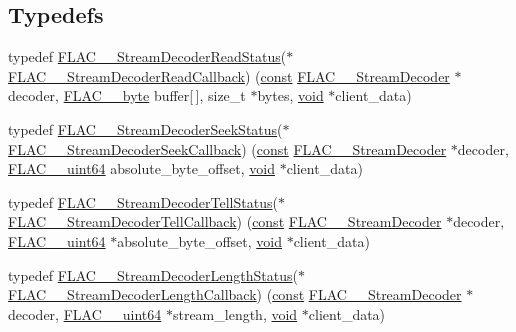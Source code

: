 \subsection*{Typedefs}
\begin{DoxyCompactItemize}
\item 
typedef \hyperlink{group__flac__stream__decoder_gad793ead451206c64a91dc0b851027b93}{F\+L\+A\+C\+\_\+\+\_\+\+Stream\+Decoder\+Read\+Status}($\ast$ \hyperlink{group__flac__stream__decoder_ga25d4321dc2f122d35ddc9061f44beae7}{F\+L\+A\+C\+\_\+\+\_\+\+Stream\+Decoder\+Read\+Callback}) (\hyperlink{zconf_8h_a2c212835823e3c54a8ab6d95c652660e}{const} \hyperlink{struct_f_l_a_c_____stream_decoder}{F\+L\+A\+C\+\_\+\+\_\+\+Stream\+Decoder} $\ast$decoder, \hyperlink{ordinals_8h_a5eb569b12d5b047cdacada4d57924ee3}{F\+L\+A\+C\+\_\+\+\_\+byte} buffer\mbox{[}$\,$\mbox{]}, size\+\_\+t $\ast$bytes, \hyperlink{png_8h_ac9c84fa68bbad002983e35ce3663c686}{void} $\ast$client\+\_\+data)
\item 
typedef \hyperlink{group__flac__stream__decoder_gac8d269e3c7af1a5889d3bd38409ed67d}{F\+L\+A\+C\+\_\+\+\_\+\+Stream\+Decoder\+Seek\+Status}($\ast$ \hyperlink{group__flac__stream__decoder_ga4c18b0216e0f7a83d7e4e7001230545d}{F\+L\+A\+C\+\_\+\+\_\+\+Stream\+Decoder\+Seek\+Callback}) (\hyperlink{zconf_8h_a2c212835823e3c54a8ab6d95c652660e}{const} \hyperlink{struct_f_l_a_c_____stream_decoder}{F\+L\+A\+C\+\_\+\+\_\+\+Stream\+Decoder} $\ast$decoder, \hyperlink{ordinals_8h_aa78c8c70a3eb8a58af7436f278acde8e}{F\+L\+A\+C\+\_\+\+\_\+uint64} absolute\+\_\+byte\+\_\+offset, \hyperlink{png_8h_ac9c84fa68bbad002983e35ce3663c686}{void} $\ast$client\+\_\+data)
\item 
typedef \hyperlink{group__flac__stream__decoder_ga83708207969383bd7b5c1e9148528845}{F\+L\+A\+C\+\_\+\+\_\+\+Stream\+Decoder\+Tell\+Status}($\ast$ \hyperlink{group__flac__stream__decoder_gafdf1852486617a40c285c0d76d451a5a}{F\+L\+A\+C\+\_\+\+\_\+\+Stream\+Decoder\+Tell\+Callback}) (\hyperlink{zconf_8h_a2c212835823e3c54a8ab6d95c652660e}{const} \hyperlink{struct_f_l_a_c_____stream_decoder}{F\+L\+A\+C\+\_\+\+\_\+\+Stream\+Decoder} $\ast$decoder, \hyperlink{ordinals_8h_aa78c8c70a3eb8a58af7436f278acde8e}{F\+L\+A\+C\+\_\+\+\_\+uint64} $\ast$absolute\+\_\+byte\+\_\+offset, \hyperlink{png_8h_ac9c84fa68bbad002983e35ce3663c686}{void} $\ast$client\+\_\+data)
\item 
typedef \hyperlink{group__flac__stream__decoder_gad5860157c2bb34501b8b9370472d727a}{F\+L\+A\+C\+\_\+\+\_\+\+Stream\+Decoder\+Length\+Status}($\ast$ \hyperlink{group__flac__stream__decoder_ga5363f3b46e3f7d6a73385f6560f7e7ef}{F\+L\+A\+C\+\_\+\+\_\+\+Stream\+Decoder\+Length\+Callback}) (\hyperlink{zconf_8h_a2c212835823e3c54a8ab6d95c652660e}{const} \hyperlink{struct_f_l_a_c_____stream_decoder}{F\+L\+A\+C\+\_\+\+\_\+\+Stream\+Decoder} $\ast$decoder, \hyperlink{ordinals_8h_aa78c8c70a3eb8a58af7436f278acde8e}{F\+L\+A\+C\+\_\+\+\_\+uint64} $\ast$stream\+\_\+length, \hyperlink{png_8h_ac9c84fa68bbad002983e35ce3663c686}{void} $\ast$client\+\_\+data)

\end{DoxyCompactItemize}
